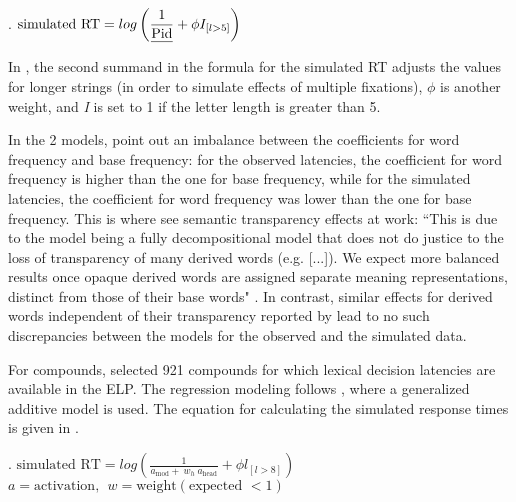 \ex.    %
\( \displaystyle \text{simulated RT} =  log \left(\frac{1}{\text{\emph{Pid}}} + \phi I_{[l > 5]}\right)       \)

\enlargethispage{2\baselineskip}
In \Last, the second
    summand in the formula for the simulated RT adjusts the values for
    longer strings (in order to simulate effects of multiple fixations), $\phi$ is another weight, and \emph{I} is set to 1 if the letter length is greater than
    5. \pagebreak[4]

In the 2 models, \citet{Baayenetal:2011} point out an imbalance
between the coefficients for word frequency and base frequency: for
the observed latencies, the coefficient for word frequency is higher
than the one for base frequency, while for the simulated latencies,
the coefficient for word frequency was lower than the one for base
frequency. This is where \citet{Baayenetal:2011} see semantic
transparency effects at work: ``This is due to the model being a fully decompositional model that
   does not do justice to the loss of transparency of many derived
   words (e.g. [...]). We expect more balanced results once opaque
   derived words are assigned separate meaning representations,
   distinct from those of their base words"
   \citep[463]{Baayenetal:2011}. 
In contrast, similar effects for derived words independent of their
transparency reported by \citet{Rastleetal:2004} lead to no such
discrepancies between the models for the observed and the simulated data.

For compounds, \citet{Baayenetal:2011} selected 921 compounds for which lexical decision latencies are
available in the ELP. The regression modeling follows \citet{Baayen:2010},
where a generalized additive model is used. 
The equation for
calculating the simulated response times is given in \Next.

\ex.
\( \displaystyle \text{simulated RT} = log \left(\frac{1}{a_{\text{mod}} + \: w_h \: a_{\text{head}}} + \phi l_{[l > 8]}\right)       \)
\\ %
\( \displaystyle       a = \text{activation},\:\: w = \text{weight} (\text{expected } < 1) \)

